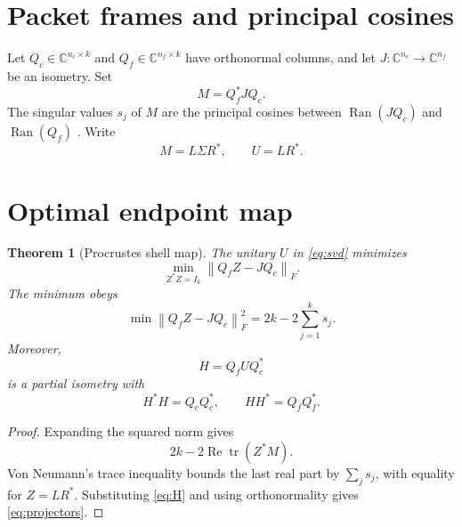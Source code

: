 \documentclass[12pt]{article}
\newtheorem{theorem}{Theorem}[section]\newtheorem{proposition}[theorem]{Proposition}
\theoremstyle{remark}\newtheorem{remark}[theorem]{Remark}
\newcommand{\norm}[1]{\left\lVert#1\right\rVert}
\begin{document}
\section{Packet frames and principal cosines}

Let $Q_c\in\mathbb C^{n_c\times k}$ and
$Q_f\in\mathbb C^{n_f\times k}$ have orthonormal columns, and let
$J:\mathbb C^{n_c}\to\mathbb C^{n_f}$ be an isometry.  Set
\begin{equation}\label{eq:overlap}
 M=Q_f^*JQ_c.
\end{equation}
The singular values $s_j$ of $M$ are the principal cosines between
$\operatorname{Ran}(JQ_c)$ and $\operatorname{Ran}(Q_f)$
\citep{StewartSun1990}.  Write
\begin{equation}\label{eq:svd}
 M=L\Sigma R^*,\qquad U=LR^*.
\end{equation}

\section{Optimal endpoint map}

\begin{theorem}[Procrustes shell map]\label{thm:procrustes}
The unitary $U$ in \eqref{eq:svd} minimizes
\begin{equation}\label{eq:minimization}
 \min_{Z^*Z=I_k}\norm{Q_fZ-JQ_c}_F.
\end{equation}
The minimum obeys
\begin{equation}\label{eq:cost}
 \min\norm{Q_fZ-JQ_c}_F^2
 =2k-2\sum_{j=1}^k s_j.
\end{equation}
Moreover,
\begin{equation}\label{eq:H}
 H=Q_fUQ_c^*
\end{equation}
is a partial isometry with
\begin{equation}\label{eq:projectors}
 H^*H=Q_cQ_c^*,\qquad HH^*=Q_fQ_f^*.
\end{equation}
\end{theorem}

\begin{proof}
Expanding the squared norm gives
\begin{equation*}
 2k-2\operatorname{Re}\operatorname{tr}(Z^*M).
\end{equation*}
Von Neumann's trace inequality bounds the last real part by
$\sum_js_j$, with equality for $Z=LR^*$.  Substituting \eqref{eq:H} and
using orthonormality gives \eqref{eq:projectors}.
\end{proof}
\end{document}
